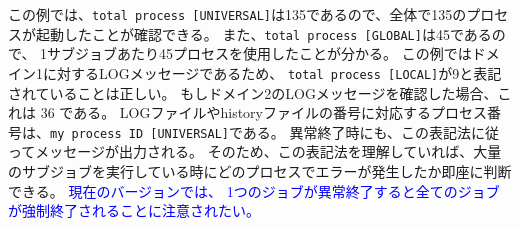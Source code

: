 この例では、\verb|total process [UNIVERSAL]|は135であるので、全体で135のプロセスが起動したことが確認できる。
また、\verb|total process [GLOBAL]|は45であるので、
1サブジョブあたり45プロセスを使用したことが分かる。
この例ではドメイン1に対するLOGメッセージであるため、
\verb|total process [LOCAL]|が9と表記されていることは正しい。
もしドメイン2のLOGメッセージを確認した場合、これは 36 である。
LOGファイルやhistoryファイルの番号に対応するプロセス番号は、\verb|my process ID [UNIVERSAL]|である。
異常終了時にも、この表記法に従ってメッセージが出力される。
そのため、この表記法を理解していれば、大量のサブジョブを実行している時にどのプロセスでエラーが発生したか即座に判断できる。
\textcolor{blue}{現在のバージョンでは、
1つのジョブが異常終了すると全てのジョブが強制終了されることに注意されたい。}


